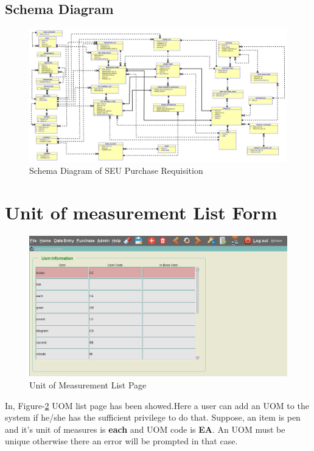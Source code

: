 \documentclass[12pt]{report} %
\begin{document}
\begin{landscape}
\subsection{Schema Diagram}
\begin{figure}[h]
	\begin{center}
		\includegraphics[width=1.3\textwidth]{pic/schema/seupr_schema.png}
	\end{center}
	\caption{Schema Diagram of SEU Purchase Requisition}
	\label{fig:context_level}
\end{figure}
\thispagestyle{empty} 
\end{landscape}
\clearpage
\fi

\section{Unit of measurement List Form}
\begin{figure}[h]
	\includegraphics[width=1\textwidth]{pic/unit_list_page.PNG}
	\caption{Unit of Measurement List Page}
	\label{fig:unit_list_page}
\end{figure}
In, Figure-\ref{fig:unit_list_page} UOM list page has been showed.Here a user can add an UOM to the system if he/she has the sufficient privilege to do that. Suppose, an item is pen and it's unit of measures is \textbf{each} and UOM code is \textbf{EA}.   An UOM must be unique otherwise there an error will be prompted in that case. \\
\end{document}
